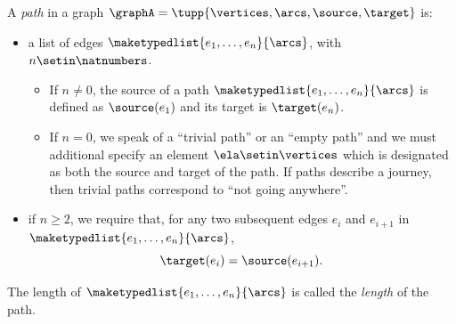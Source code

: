 \begin{ctdefinition}[Paths]
    \label{def:path}
    A \emph{path} in a graph $\graphA=\tupp{\vertices,\arcs, \source,\target}$ is:

    \constit

    \begin{itemize}
        \item a list of edges $\maketypedlist{e_1, \dots, e_n}{\arcs}$, with $n \setin \natnumbers$.
              \begin{itemize}
                  \item If $n \neq 0$, the source of a path $\maketypedlist{e_1, \dots, e_n}{\arcs}$ is defined as $\source(e_1)$ and its target is $\target(e_n)$.
                  \item If $n = 0$, we speak of a ``trivial path'' or an ``empty path'' and we must additional specify an element $\ela \setin \vertices$ which is designated as both the source and target of the path.
                        If paths describe a journey, then trivial paths correspond to ``not going anywhere''.
              \end{itemize}
    \end{itemize}

    \condit

    \begin{itemize}
        \item if $n \geq 2$, we require that, for any two subsequent edges $e_i$ and $e_{i+1}$ in $\maketypedlist{e_1, \dots, e_n}{\arcs}$,
              \begin{equation}
                  \target(e_i) = \source(e_{i+1}).
              \end{equation}
    \end{itemize}
    The length of $\maketypedlist{e_1, \dots, e_n}{\arcs}$ is called the \emph{length} of the path.
\end{ctdefinition}
